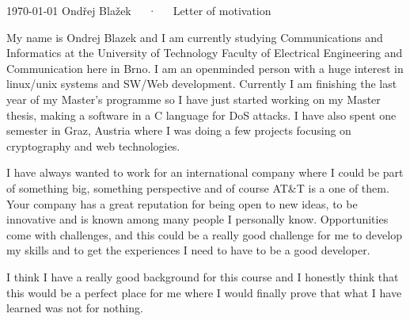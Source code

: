 \documentclass[11pt, a4paper]{awesome-cv}
\begin{document}
\makecvheader

\makecvfooter
  {\today}
  {Ondřej Blažek~~~·~~~Letter of motivation}
  {}

\makelettertitle

\begin{cvletter}

My name is Ondrej Blazek and I am currently studying Communications and Informatics at the University of Technology Faculty of Electrical Engineering and Communication here in Brno. I am an openminded person with a huge interest in linux/unix systems and SW/Web development.
Currently I am finishing the last year of my Master's programme so I have just started working on my Master thesis, making a software in a C language for DoS attacks. I have also spent one
semester in Graz, Austria where I was doing a few projects focusing on cryptography and web technologies.

I have always wanted to work for an international company where I could be part of something big, something perspective and of course AT\&T is a one of them. 
Your company has a great reputation for being open to new ideas, to be innovative and is known among many people I personally know.
Opportunities come with challenges, and this could be a really good challenge for me to develop my skills and to get the experiences I need to have to be a good developer.


I think I have a really good background for this course and I honestly think that this would be a perfect place for me where I would finally prove that what I have learned was not for nothing.  
\end{cvletter}


\makeletterclosing
\end{document}
